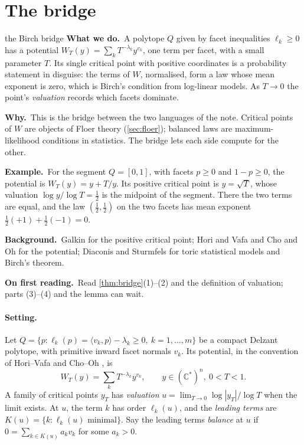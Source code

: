 \documentclass[11pt]{article}
\theoremstyle{definition}\newtheorem{definition}[theorem]{Definition}\newtheorem{remark}[theorem]{Remark}\newtheorem{example}[theorem]{Example}\newtheorem{problem}[theorem]{Open problem}\crefname{problem}{Problem}{Problems}
\newcommand{\rbwhat}{\textcolor{rbWhat}{\textbf{What we do.}}~}\newcommand{\rbwhy}{\par\smallskip\textcolor{rbWhy}{\textbf{Why.}}~}
\newcommand{\rbex}{\par\smallskip\textcolor{rbEx}{\textbf{Example.}}~}\newcommand{\rbbg}{\par\smallskip\textcolor{rbBg}{\textbf{Background.}}~}
\newcommand{\rbfirst}{\par\smallskip\textcolor{rbFirst}{\textbf{On first reading.}}~}
\begin{document}
\section{The bridge}\label{sec:bridge}
\begin{readerbox}{the Birch bridge}
\rbwhat A polytope $Q$ given by facet inequalities $\ell_k\ge0$ has a potential $W_T(y)=\sum_kT^{-\lambda_k}y^{v_k}$, one term per facet, with a small parameter $T$. Its single critical point with positive coordinates is a probability statement in disguise: the terms of $W$, normalised, form a law whose mean exponent is zero, which is Birch's condition from log-linear models. As $T\to0$ the point's \emph{valuation} records which facets dominate.
\rbwhy This is the bridge between the two languages of the note. Critical points of $W$ are objects of Floer theory (\cref{sec:floer}); balanced laws are maximum-likelihood conditions in statistics. The bridge lets each side compute for the other.
\rbex For the segment $Q=[0,1]$, with facets $p\ge0$ and $1-p\ge0$, the potential is $W_T(y)=y+T/y$. Its positive critical point is $y=\sqrt T$, whose valuation $\log y/\log T=\tfrac12$ is the midpoint of the segment. There the two terms are equal, and the law $(\tfrac12,\tfrac12)$ on the two facets has mean exponent $\tfrac12(+1)+\tfrac12(-1)=0$.
\rbbg Galkin \cite{Galkin2014} for the positive critical point; Hori and Vafa \cite{HoriVafa2000} and Cho and Oh \cite{ChoOh2006} for the potential; Diaconis and Sturmfels \cite{DiaconisSturmfels1998} for toric statistical models and Birch's theorem.
\rbfirst Read \cref{thm:bridge}(1)--(2) and the definition of valuation; parts (3)--(4) and the lemma can wait.
\end{readerbox}
\paragraph{Setting.} Let $Q=\{p:\ell_k(p)=\langle v_k,p\rangle-\lambda_k\ge0,\ k=1,\dots,m\}$ be a compact Delzant polytope, with primitive inward facet normals $v_k$. Its
potential, in the convention of Hori--Vafa and Cho--Oh \cite{HoriVafa2000,ChoOh2006}, is
\[
W_T(y)=\sum_kT^{-\lambda_k}y^{v_k},\qquad y\in(\mathbb C^*)^n,\ 0<T<1 .
\]
A family of critical points $y_T$ has \emph{valuation} $u=\lim_{T\to0}\log|y_T|/\log T$ when the limit exists. At $u$, the term $k$ has order $\ell_k(u)$, and the
\emph{leading terms} are $K(u)=\{k:\ell_k(u)\text{ minimal}\}$. Say the leading terms \emph{balance} at $u$ if $0=\sum_{k\in K(u)}a_kv_k$ for some $a_k>0$.
\end{document}
